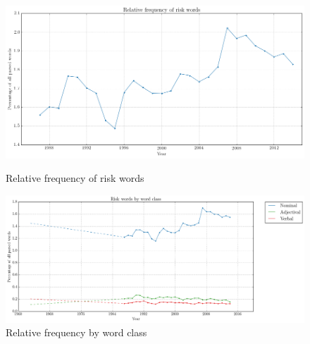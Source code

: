 
          \noindent
          \begin{figure}[htb!]
          \centering
          \begin{minipage}{.45\textwidth}
          \centering
          \includegraphics[width=.95\textwidth]{../images/relative_frequency_of_risk_words.png}
          \caption{Relative frequency of risk words}
          \label{fig:relative_frequency_of_risk_words}
          \end{minipage}%
          \begin{minipage}{.55\textwidth}
          \centering
          \includegraphics[width=.95\textwidth]{../images/risk_words_by_word_class.png}
          \caption{Relative frequency by word class}
          \label{fig:wordclasses}
          \end{minipage}
          \end{figure}




